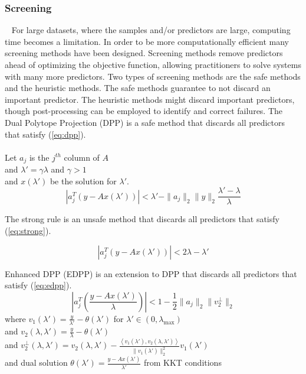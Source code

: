 \documentclass{article}
\begin{document}
\subsubsection*{Screening}
\qquad ~ For large datasets, where the samples and/or predictors are large, computing time becomes a limitation. In order to be more computationally efficient many screening methods have been designed. Screening methods remove predictors ahead of optimizing the objective function, allowing practitioners to solve systems with many more predictors. Two types of screening methods are the safe methods and the heuristic methods. The safe methods guarantee to not discard an important predictor. The heuristic methods might discard important predictors, though post-processing can be employed to identify and correct failures. The Dual Polytope Projection (DPP) is a safe method that discards all predictors that satisfy (\ref{eq:dpp}).\\
\\
Let $a_j$ is the $j^{th}$ column of $A$ \\
and $\lambda' = \gamma \lambda$ and $\gamma > 1$ \\ 
and $x(\lambda')$ be the solution for $\lambda'$.\\

\begin{equation} \label{eq:dpp}
|a_j^T (y - Ax(\lambda'))| < \lambda' - \|a_j\|_2 \|y\|_2 \frac{\lambda'-\lambda}{\lambda}
\end{equation}

The strong rule is an unsafe method that discards all predictors that satisfy (\ref{eq:strong}). 

\begin{equation} \label{eq:strong}
|a_j^T (y - Ax(\lambda'))| < 2\lambda - \lambda'
\end{equation}

Enhanced DPP (EDPP) is an extension to DPP that discards all predictors that satisfy (\ref{eq:edpp}).\\

\begin{equation} \label{eq:edpp}
\left|a_j^T \left(\frac{y - Ax(\lambda')}{\lambda}\right)\right| < 1 - \frac 12 \|a_j\|_2 \|v_2^{\perp}\|_2
\end{equation}
where $v_1(\lambda') = \frac{y}{\lambda'} - \theta(\lambda')$ for $\lambda' \in (0, \lambda_{\max})$\\
and $v_2(\lambda,\lambda') = \frac{y}{\lambda} - \theta(\lambda')$\\
and $v_2^{\perp}(\lambda,\lambda') = v_2(\lambda,\lambda') - \frac{\left<v_1(\lambda'),v_2(\lambda,\lambda')\right>}{\|v_1(\lambda')\|^2_2} v_1(\lambda')$\\
and dual solution $\theta(\lambda') = \frac{y-Ax(\lambda')}{\lambda'} $ from KKT conditions \\
\end{document}
